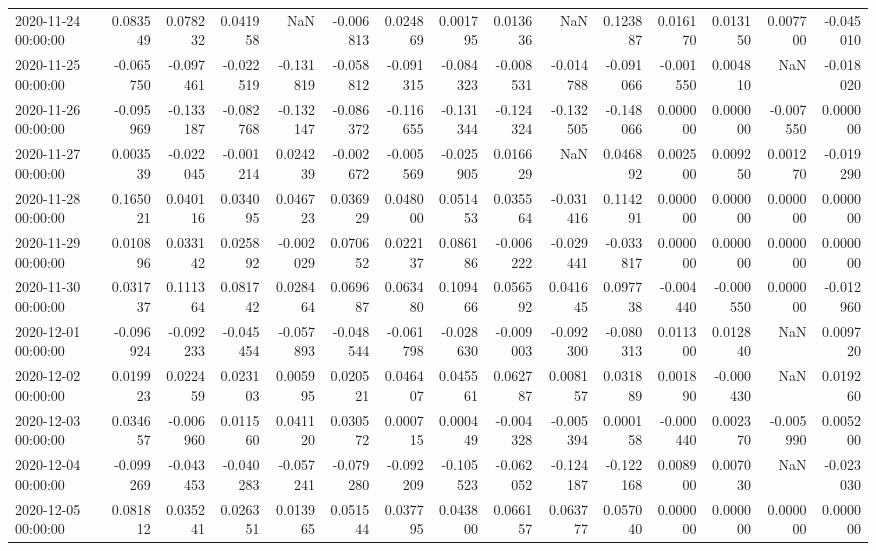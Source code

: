 \begin{tabular}{lrrrrrrrrrrrrrr}
2020-11-24 00:00:00 & 0.083549 & 0.078232 & 0.041958 & NaN & -0.006813 & 0.024869 & 0.001795 & 0.013636 & NaN & 0.123887 & 0.016170 & 0.013150 & 0.007700 & -0.045010 \\
2020-11-25 00:00:00 & -0.065750 & -0.097461 & -0.022519 & -0.131819 & -0.058812 & -0.091315 & -0.084323 & -0.008531 & -0.014788 & -0.091066 & -0.001550 & 0.004810 & NaN & -0.018020 \\
2020-11-26 00:00:00 & -0.095969 & -0.133187 & -0.082768 & -0.132147 & -0.086372 & -0.116655 & -0.131344 & -0.124324 & -0.132505 & -0.148066 & 0.000000 & 0.000000 & -0.007550 & 0.000000 \\
2020-11-27 00:00:00 & 0.003539 & -0.022045 & -0.001214 & 0.024239 & -0.002672 & -0.005569 & -0.025905 & 0.016629 & NaN & 0.046892 & 0.002500 & 0.009250 & 0.001270 & -0.019290 \\
2020-11-28 00:00:00 & 0.165021 & 0.040116 & 0.034095 & 0.046723 & 0.036929 & 0.048000 & 0.051453 & 0.035564 & -0.031416 & 0.114291 & 0.000000 & 0.000000 & 0.000000 & 0.000000 \\
2020-11-29 00:00:00 & 0.010896 & 0.033142 & 0.025892 & -0.002029 & 0.070652 & 0.022137 & 0.086186 & -0.006222 & -0.029441 & -0.033817 & 0.000000 & 0.000000 & 0.000000 & 0.000000 \\
2020-11-30 00:00:00 & 0.031737 & 0.111364 & 0.081742 & 0.028464 & 0.069687 & 0.063480 & 0.109466 & 0.056592 & 0.041645 & 0.097738 & -0.004440 & -0.000550 & 0.000000 & -0.012960 \\
2020-12-01 00:00:00 & -0.096924 & -0.092233 & -0.045454 & -0.057893 & -0.048544 & -0.061798 & -0.028630 & -0.009003 & -0.092300 & -0.080313 & 0.011300 & 0.012840 & NaN & 0.009720 \\
2020-12-02 00:00:00 & 0.019923 & 0.022459 & 0.023103 & 0.005995 & 0.020521 & 0.046407 & 0.045561 & 0.062787 & 0.008157 & 0.031889 & 0.001890 & -0.000430 & NaN & 0.019260 \\
2020-12-03 00:00:00 & 0.034657 & -0.006960 & 0.011560 & 0.041120 & 0.030572 & 0.000715 & 0.000449 & -0.004328 & -0.005394 & 0.000158 & -0.000440 & 0.002370 & -0.005990 & 0.005200 \\
2020-12-04 00:00:00 & -0.099269 & -0.043453 & -0.040283 & -0.057241 & -0.079280 & -0.092209 & -0.105523 & -0.062052 & -0.124187 & -0.122168 & 0.008900 & 0.007030 & NaN & -0.023030 \\
2020-12-05 00:00:00 & 0.081812 & 0.035241 & 0.026351 & 0.013965 & 0.051544 & 0.037795 & 0.043800 & 0.066157 & 0.063777 & 0.057040 & 0.000000 & 0.000000 & 0.000000 & 0.000000 \\

\end{tabular}
